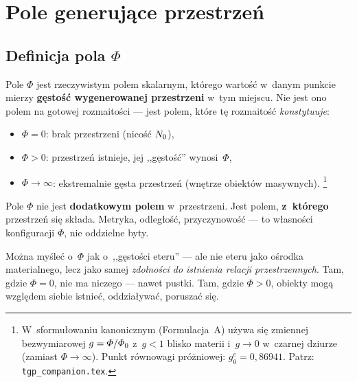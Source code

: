 \section{Pole generuj\k{a}ce przestrze\'n}\label{sec:pole}

\subsection{Definicja pola $\Phi$}

\begin{definition}\label{def:Phi}
Pole $\Phi$ jest rzeczywistym polem skalarnym, kt\'orego warto\'s\'c
w~danym punkcie mierzy \textbf{g\k{e}sto\'s\'c wygenerowanej przestrzeni}
w~tym miejscu. Nie jest ono polem na gotowej rozmaito\'sci ---
jest polem, kt\'ore t\k{e} rozmaito\'s\'c \emph{konstytuuje}:
\begin{itemize}[nosep]
  \item $\Phi = 0$: brak przestrzeni (nico\'s\'c $N_0$),
  \item $\Phi > 0$: przestrze\'n istnieje, jej ,,g\k{e}sto\'s\'c''
        wynosi~$\Phi$,
  \item $\Phi \to \infty$: ekstremalnie g\k{e}sta przestrze\'n
        (wn\k{e}trze obiekt\'ow masywnych).%
        \footnote{W~sformu\l{}owaniu kanonicznym (Formulacja~A) u\.zywa si\k{e}
        zmiennej bezwymiarowej $g = \varPhi/\varPhi_0$ z~$g < 1$ blisko materii
        i~$g \to 0$ w~czarnej dziurze (zamiast $\Phi \to \infty$).
        Punkt r\'ownowagi pr\'o\.zniowej: $g_0^e = 0{,}86941$.
        Patrz: \texttt{tgp\_companion.tex}.}
\end{itemize}
\end{definition}

Pole $\Phi$ nie jest \textbf{dodatkowym polem} w~przestrzeni.
Jest polem, \textbf{z~kt\'orego} przestrze\'n si\k{e} sk\l{}ada.
Metryka, odleg\l{}o\'s\'c, przyczynowo\'s\'c --- to w\l{}asno\'sci
konfiguracji $\Phi$, nie oddzielne byty.

\begin{remark}
Mo\.zna my\'sle\'c o~$\Phi$ jak o~,,g\k{e}sto\'sci eteru'' ---
ale nie eteru jako o\'srodka materialnego, lecz jako samej
\emph{zdolno\'sci do istnienia relacji przestrzennych}.
Tam, gdzie $\Phi = 0$, nie ma niczego --- nawet pustki.
Tam, gdzie $\Phi > 0$, obiekty mog\k{a} wzgl\k{e}dem siebie
istnie\'c, oddzia\l{}ywa\'c, porusza\'c si\k{e}.
\end{remark}

